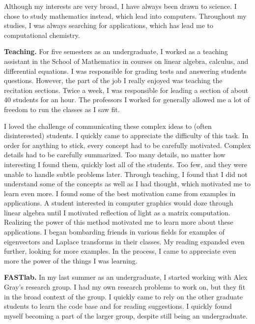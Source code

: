 \documentclass[twoside,leqno, 12pt]{article}
\begin{document}
Although my interests are very broad, I have always been drawn to science.  I chose to study mathematics instead, which lead into computers.  Throughout my studies, I was always searching for applications, which has lead me to computational chemistry.  




\textbf{Teaching.}  For five semesters as an undergraduate, I worked as a teaching assistant in the School of Mathematics in courses on linear algebra, calculus, and differential equations.  I was responsible for grading tests and answering students questions.  However, the part of the job I really enjoyed was teaching the recitation sections.  Twice a week, I was responsible for leading a section of about 40 students for an hour.  The professors I worked for generally allowed me a lot of freedom to run the classes as I saw fit.  

I loved the challenge of communicating these complex ideas to (often disinterested) students.  I quickly came to appreciate the difficulty of this task.  In order for anything to stick, every concept had to be carefully motivated.  Complex details had to be carefully summarized.  Too many details, no matter how interesting I found them, quickly lost all of the students.  Too few, and they were unable to handle subtle problems later.  Through teaching, I found that I did not understand some of the concepts as well as I had thought, which motivated me to learn even more.  I found some of the best motivation came from examples in applications.  A student interested in computer graphics would doze through linear algebra until I motivated reflection of light as a matrix computation.  Realizing the power of this method motivated me to learn more about these applications.  I began bombarding friends in various fields for examples of eigenvectors and Laplace transforms in their classes.  My reading expanded even further, looking for more examples.  In the process, I came to appreciate even more the power of the things I was learning.  


\textbf{FASTlab.}  In my last summer as an undergraduate, I started working with Alex Gray's research group.  I had my own research problems to work on, but they fit in the broad context of the group.  I quickly came to rely on the other graduate students to learn the code base and for reading suggestions.  I quickly found myself becoming a part of the larger group, despite still being an undergraduate.  
\end{document}

